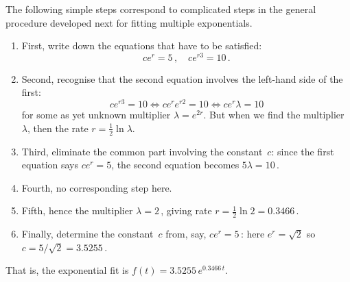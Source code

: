 \begin{draft}
\begin{example}
\begin{solution}
The following simple steps correspond to complicated steps in the general procedure developed next for fitting multiple exponentials.
\begin{enumerate}
\item First, write down the equations that have to be satisfied:
\begin{equation*}
ce^{r}=5\,,\quad ce^{r3}=10\,.
\end{equation*}
\item Second, recognise that the second equation involves the left-hand side of the first:
\begin{equation*}
ce^{r3}=10 \iff ce^re^{r2}=10\iff ce^r\lambda=10
\end{equation*}
for some as yet unknown multiplier \(\lambda=e^{2r}\).
But when we find the multiplier~\(\lambda\), then the rate \(r=\tfrac12\ln\lambda\).
\item Third, eliminate the common part involving the constant~\(c\): since the first equation says \(ce^r=5\), the second equation becomes \(5\lambda=10\)\,.
\item Fourth, no corresponding step here.
\item Fifth, hence the multiplier \(\lambda=2\)\,, giving rate \(r=\tfrac12\ln 2=0.3466\)\,.
\item Finally, determine the constant~\(c\) from, say, \(ce^r=5\)\,:
here \(e^r=\sqrt2\) so \(c=5/\sqrt2=3.5255\)\,.
\end{enumerate}
That is, the exponential fit is \(f(t)=3.5255\,e^{0.3466\,t}\).
\end{solution}
\end{example}








\end{draft}
